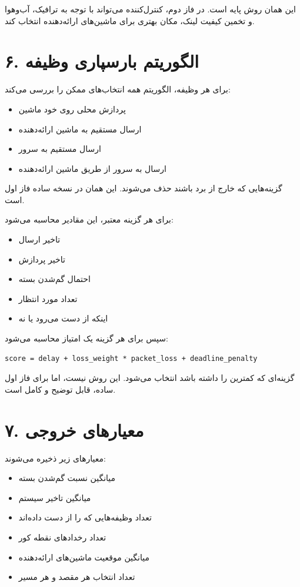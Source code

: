 \documentclass[12pt]{exam}
\begin{document}
\begin{questions}
این همان روش پایه است. در فاز دوم، کنترل‌کننده  می‌تواند با توجه به
ترافیک، آب‌وهوا و تخمین کیفیت لینک، مکان بهتری برای ماشین‌های ارائه‌دهنده انتخاب کند.

\section*{۶. الگوریتم بارسپاری وظیفه}
برای هر وظیفه، الگوریتم همه انتخاب‌های ممکن را بررسی می‌کند:

\begin{itemize}
\item پردازش محلی روی خود ماشین
\item ارسال مستقیم به ماشین ارائه‌دهنده
\item ارسال مستقیم به سرور 
\item ارسال به سرور  از طریق ماشین ارائه‌دهنده
\end{itemize}

گزینه‌هایی که خارج از برد باشند حذف می‌شوند. این همان  در
نسخه ساده فاز اول است.

برای هر گزینه معتبر، این مقادیر محاسبه می‌شود:

\begin{itemize}
\item تاخیر ارسال
\item تاخیر پردازش
\item احتمال گم‌شدن بسته
\item تعداد مورد انتظار 
\item اینکه  از دست می‌رود یا نه
\end{itemize}

سپس برای هر گزینه یک امتیاز محاسبه می‌شود:

\begin{latin}
\begin{lstlisting}
score = delay + loss_weight * packet_loss + deadline_penalty
\end{lstlisting}
\end{latin}

گزینه‌ای که کمترین  را داشته باشد انتخاب می‌شود. این روش  نیست،
اما برای فاز اول ساده، قابل توضیح و کامل است.

\section*{۷. معیارهای خروجی}
معیارهای زیر ذخیره می‌شوند:

\begin{itemize}
\item میانگین نسبت گم‌شدن بسته
\item میانگین تاخیر سیستم
\item تعداد وظیفه‌هایی که  را از دست داده‌اند
\item تعداد رخدادهای نقطه کور
\item میانگین موقعیت ماشین‌های ارائه‌دهنده
\item تعداد انتخاب هر مقصد و هر مسیر
\end{itemize}


\end{questions}
\end{document}
